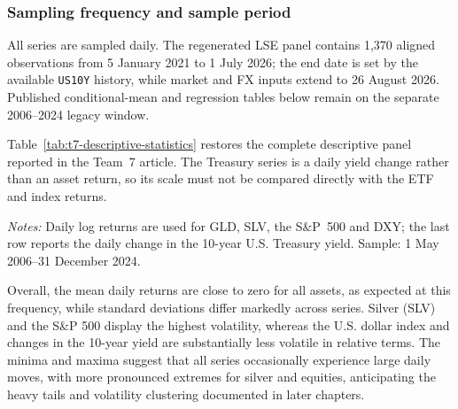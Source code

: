 \subsubsection{Sampling frequency and sample period}

All series are sampled daily. The regenerated LSE panel contains 1,370 aligned
observations from 5 January 2021 to 1 July 2026; the end date is set by the
available \texttt{US10Y} history, while market and FX inputs extend to 26
August 2026. Published conditional-mean and regression tables below remain on
the separate 2006--2024 legacy window.

Table~\ref{tab:t7-descriptive-statistics} restores the complete descriptive
panel reported in the Team~7 article. The Treasury series is a daily yield
change rather than an asset return, so its scale must not be compared directly
with the ETF and index returns.

\begin{table}[htbp]
\centering
\caption{Descriptive statistics for the synchronized Team~7 sample}
\label{tab:t7-descriptive-statistics}
\small
{}
\begin{minipage}{0.96\textwidth}
\footnotesize\emph{Notes:} Daily log returns are used for GLD, SLV, the
S\&P~500 and DXY; the last row reports the daily change in the 10-year U.S.
Treasury yield. Sample: 1 May 2006--31 December 2024.
\end{minipage}
\end{table}


Overall, the mean daily returns are close to zero for all assets, as expected at this
frequency, while standard deviations differ markedly across series. Silver (SLV) and the
S\&P 500 display the highest volatility, whereas the U.S. dollar index and changes in the
10-year yield are substantially less volatile in relative terms. The minima and maxima
suggest that all series occasionally experience large daily moves, with more pronounced
extremes for silver and equities, anticipating the heavy tails and volatility clustering
documented in later chapters.

